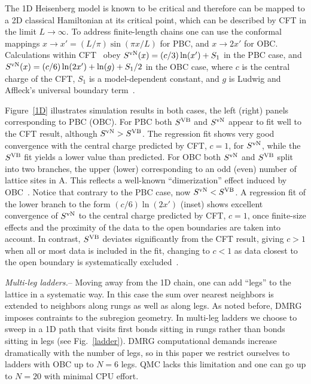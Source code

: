 \documentclass[prl,aps,twocolumn,floatfix,amsmath,amssymb,superscriptaddress,tightenlines]{revtex4}
\begin{document}
The 1D Heisenberg model is known to be critical and therefore can be
mapped to a 2D classical Hamiltonian at its critical point, which
can be described by CFT in the limit $L\to\infty$.  To address
finite-length chains one can use the conformal mappings $x\to x'=(L/\pi)
\sin(\pi x / L)$ for PBC, and 
$x\to 2x'$ for OBC. %
Calculations within CFT~\cite{Cardy} obey $S^{\rm vN}(x)= (c/3)
\ln(x') + S_1$ in the PBC case, and $S^{\rm vN}(x)= (c/6) \ln(2x') +
\ln(g)+S_1/2$ in the OBC case, where $c$ is the central charge of the CFT,
$S_1$ is a model-dependent constant, and $g$ is Ludwig and Affleck's
universal boundary term~\cite{AffleckAndLudwig}.

Figure~\ref{1D} illustrates simulation results in both cases, the left
(right) panels corresponding to PBC (OBC). 
For PBC both
$S^{\rm VB}$ and $S^{ \rm vN}$ appear to fit well to the CFT result, although
$S^{ \rm vN} > S^{\rm VB}$. The regression fit shows very good
convergence with the central charge predicted by CFT, $c=1$, for $S^{ \rm vN}$, while
the $S^{\rm VB}$ fit yields a lower value than predicted.
For OBC both $S^{ \rm vN}$ and $S^{\rm VB}$ split into two branches, the upper (lower)
corresponding to an odd (even) number of lattice sites in A.  This
reflects a well-known ``dimerization'' effect induced by OBC~\cite{Ian1}.
Notice that contrary to the PBC case, now $S^{ \rm vN} < S^{\rm VB}$. 
A regression fit of the lower branch to the form $(c/6) \ln
({2x'})$ (inset) shows excellent convergence of $S^{ \rm vN}$ to the central
charge predicted by CFT, $c=1$, once finite-size effects and the proximity
of the data to the open boundaries are taken into account.  In contrast,
 $S^{\rm VB}$ deviates significantly from the CFT result, giving 
$c>1$ when all or most data is included in the fit, changing to $c<1$
as data closest to the open boundary is systematically excluded~\cite{XXX}.

{\it Multi-leg ladders.}-- Moving away from the 1D chain, one can add
``legs'' to the lattice in a systematic way. In this case the sum over
nearest neighbors is extended to neighbors along rungs as well as along
legs.  As noted before, DMRG imposes contraints to the subregion
geometry. In multi-leg ladders we choose to sweep in a 1D path that visits
first bonds sitting in rungs rather than bonds sitting in legs (see
Fig.~\ref{ladder}).  DMRG computational demands increase dramatically with
the number of legs, so in this paper we restrict ourselves to ladders with
OBC up to $N=6$ legs. QMC lacks this limitation and one can go up to
$N=20$ with minimal CPU effort.
\end{document}
